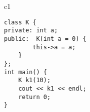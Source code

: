 
\begin{chunk}{c1}
\begin{verbatim}
class K {
private: int a;
public:  K(int a = 0) {
        this->a = a;
    }
};
int main() {
    K k1(10);
    cout << k1 << endl;
    return 0;
}
\end{verbatim}
\end{chunk}


